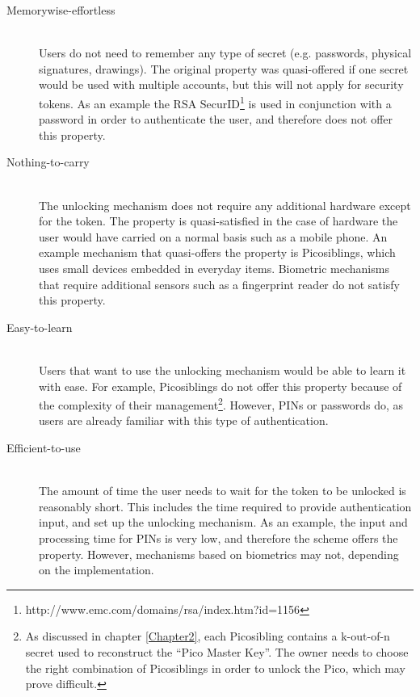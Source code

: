 \begin{description}
  
  \item[Memorywise-effortless] \hfill \\
  Users do not need to remember any type of secret (e.g. passwords, physical signatures, drawings). The original property was quasi-offered if one secret would be used with multiple accounts, but this will not apply for security tokens. As an example the RSA SecurID\footnote{http://www.emc.com/domains/rsa/index.htm?id=1156} is used in conjunction with a password in order to authenticate the user, and therefore does not offer this property.
  
  \item[Nothing-to-carry] \hfill \\
  The unlocking mechanism does not require any additional hardware except for the token. The property is quasi-satisfied in the case of hardware the user would have carried on a normal basis such as a mobile phone. An example mechanism that quasi-offers the property is Picosiblings, which uses small devices embedded in everyday items. Biometric mechanisms that require additional sensors such as a fingerprint reader do not satisfy this property. 
  
  \item[Easy-to-learn] \hfill \\
  Users that want to use the unlocking mechanism would be able to learn it with ease. For example, Picosiblings do not offer this property because of the complexity of their management\footnote{As discussed in chapter \ref{Chapter2}, each Picosibling contains a k-out-of-n secret used to reconstruct the ``Pico Master Key''. The owner needs to choose the right combination of Picosiblings in order to unlock the Pico, which may prove difficult.}. However, PINs or passwords do, as users are already familiar with this type of authentication.
  
  \item[Efficient-to-use] \hfill \\
  The amount of time the user needs to wait for the token to be unlocked is reasonably short. This includes the time required to provide authentication input, and set up the unlocking mechanism. As an example, the input and processing time for PINs is very low, and therefore the scheme offers the property. However, mechanisms based on biometrics may not, depending on the implementation.
  

\end{description}
